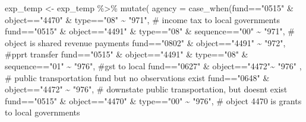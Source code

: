 \documentclass[
  letterpaper,
  DIV=11,
  numbers=noendperiod]{scrreport}
\newenvironment{Shaded}{\begin{snugshade}}{\end{snugshade}}
\newcommand{\AttributeTok}[1]{\textcolor[rgb]{0.40,0.45,0.13}{#1}}
\newcommand{\CommentTok}[1]{\textcolor[rgb]{0.37,0.37,0.37}{#1}}
\newcommand{\FunctionTok}[1]{\textcolor[rgb]{0.28,0.35,0.67}{#1}}
\newcommand{\NormalTok}[1]{\textcolor[rgb]{0.00,0.23,0.31}{#1}}
\newcommand{\OtherTok}[1]{\textcolor[rgb]{0.00,0.23,0.31}{#1}}
\newcommand{\SpecialCharTok}[1]{\textcolor[rgb]{0.37,0.37,0.37}{#1}}
\newcommand{\StringTok}[1]{\textcolor[rgb]{0.13,0.47,0.30}{#1}}
\begin{document}
\begin{Shaded}
\begin{Highlighting}[]
\NormalTok{exp\_temp }\OtherTok{\textless{}{-}}\NormalTok{ exp\_temp }\SpecialCharTok{\%\textgreater{}\%} \FunctionTok{mutate}\NormalTok{(}
  \AttributeTok{agency =} \FunctionTok{case\_when}\NormalTok{(fund}\SpecialCharTok{==}\StringTok{"0515"} \SpecialCharTok{\&}\NormalTok{ object}\SpecialCharTok{==}\StringTok{"4470"} \SpecialCharTok{\&}\NormalTok{ type}\SpecialCharTok{==}\StringTok{"08"} \SpecialCharTok{\textasciitilde{}} \StringTok{"971"}\NormalTok{, }\CommentTok{\# income tax to local governments}
\NormalTok{                     fund}\SpecialCharTok{==}\StringTok{"0515"} \SpecialCharTok{\&}\NormalTok{ object}\SpecialCharTok{==}\StringTok{"4491"} \SpecialCharTok{\&}\NormalTok{ type}\SpecialCharTok{==}\StringTok{"08"} \SpecialCharTok{\&}\NormalTok{ sequence}\SpecialCharTok{==}\StringTok{"00"} \SpecialCharTok{\textasciitilde{}} \StringTok{"971"}\NormalTok{, }\CommentTok{\# object is shared revenue payments}
\NormalTok{                     fund}\SpecialCharTok{==}\StringTok{"0802"} \SpecialCharTok{\&}\NormalTok{ object}\SpecialCharTok{==}\StringTok{"4491"} \SpecialCharTok{\textasciitilde{}} \StringTok{"972"}\NormalTok{, }\CommentTok{\#pprt transfer}
\NormalTok{                     fund}\SpecialCharTok{==}\StringTok{"0515"} \SpecialCharTok{\&}\NormalTok{ object}\SpecialCharTok{==}\StringTok{"4491"} \SpecialCharTok{\&}\NormalTok{ type}\SpecialCharTok{==}\StringTok{"08"} \SpecialCharTok{\&}\NormalTok{ sequence}\SpecialCharTok{==}\StringTok{"01"} \SpecialCharTok{\textasciitilde{}} \StringTok{"976"}\NormalTok{, }\CommentTok{\#gst to local}
\NormalTok{                     fund}\SpecialCharTok{==}\StringTok{"0627"} \SpecialCharTok{\&}\NormalTok{ object}\SpecialCharTok{==}\StringTok{"4472"}\SpecialCharTok{\textasciitilde{}} \StringTok{"976"}\NormalTok{ , }\CommentTok{\# public transportation fund but no observations exist}
\NormalTok{                     fund}\SpecialCharTok{==}\StringTok{"0648"} \SpecialCharTok{\&}\NormalTok{ object}\SpecialCharTok{==}\StringTok{"4472"} \SpecialCharTok{\textasciitilde{}} \StringTok{"976"}\NormalTok{, }\CommentTok{\# downstate public transportation, but doesn\textquotesingle{}t exist}
\NormalTok{                     fund}\SpecialCharTok{==}\StringTok{"0515"} \SpecialCharTok{\&}\NormalTok{ object}\SpecialCharTok{==}\StringTok{"4470"} \SpecialCharTok{\&}\NormalTok{ type}\SpecialCharTok{==}\StringTok{"00"} \SpecialCharTok{\textasciitilde{}} \StringTok{"976"}\NormalTok{, }\CommentTok{\# object 4470 is grants to local governments}

\end{Highlighting}
\end{Shaded}
\end{document}
